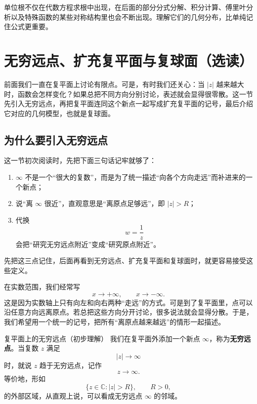 \begin{tishi}[单位根的重要性]
单位根不仅在代数方程求根中出现，在后面的部分分式分解、积分计算、傅里叶分析以及特殊函数的某些对称结构里也会不断出现。理解它们的几何分布，比单纯记住公式更重要。
\end{tishi}

\section{无穷远点、扩充复平面与复球面（选读）}

\begin{wulibj}[为什么要考虑无穷远点]
前面我们一直在复平面上讨论有限点。可是，有时我们还关心：当 $|z|$ 越来越大时，函数会怎样变化？如果总把不同方向分别讨论，表述就会显得很零散。这一节先引入无穷远点，再把复平面连同这个新点一起写成扩充复平面的记号，最后介绍它对应的几何模型，也就是复球面。
\end{wulibj}

\subsection{为什么要引入无穷远点}

\begin{tishi}[无穷远点的三个基本认识]
这一节初次阅读时，先把下面三句话记牢就够了：
\begin{enumerate}
    \item $\infty$ 不是一个``很大的复数''，而是为了统一描述``向各个方向走远''而补进来的一个新点；
    \item 说``离 $\infty$ 很近''，直观意思是``离原点足够远''，即 $|z|>R$；
    \item 代换
    \[
    w=\frac{1}{z}
    \]
    会把``研究无穷远点附近''变成``研究原点附近''。
\end{enumerate}

先把这三点记住，后面再看到无穷远点、扩充复平面和复球面时，就更容易接受这些定义。
\end{tishi}

在实数范围，我们经常写
\[
x\to +\infty,\qquad x\to -\infty.
\]
这是因为实数轴上只有向左和向右两种``走远''的方式。可是到了复平面里，点可以沿任意方向远离原点。若总把这些方向分开讨论，很多说法就会显得分散。于是，我们希望用一个统一的记号，把所有``离原点越来越远''的情形一起描述。

\begin{dingliyi}{复平面上的无穷远点（初步理解）}{}
我们在复平面外添加一个新点 $\infty$，称为\textbf{无穷远点}。当复数 $z$ 满足
\[
|z|\to \infty
\]
时，就说 $z$ 趋于无穷远点，记作
\[
z\to\infty.
\]
等价地，形如
\[
\{z\in\mathbb{C}:|z|>R\},\qquad R>0,
\]
的外部区域，从直观上说，可以看成无穷远点 $\infty$ 的邻域。
\end{dingliyi}

